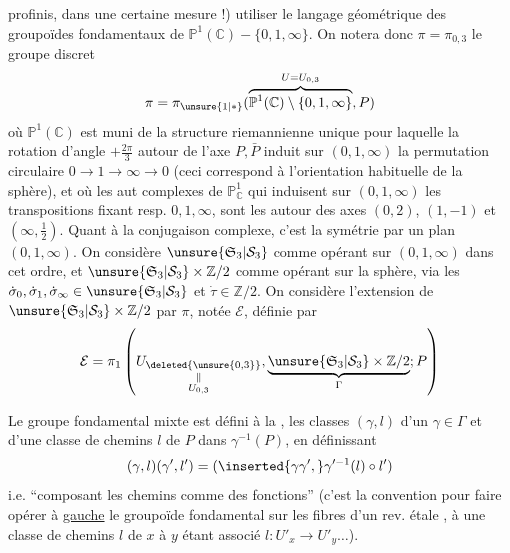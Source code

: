 profinis, dans une certaine mesure !) utiliser le langage géométrique des groupoïdes fondamentaux de $\mathbb P^1(\mathbb C)-\{0,1,\infty\}$. On  notera donc $\pi=\pi_{0,3}$ le groupe discret
\[
\pi=\pi_{\unsure{1|*}}(\overbrace{\mathbb P^1(\mathbb C)\setminus\{0,1,\infty\}}^{U=U_{0,3}},P)
\]
où $\mathbb P^1(\mathbb C)$ est muni de la structure  riemannienne  unique pour laquelle la rotation \inserted{$\dot\rho$} d'angle $+\frac{2\pi}{3}$ autour de l'axe $P,\bar P$  induit sur $(0,1,\infty)$ la permutation circulaire $0\longrightarrow1\longrightarrow\infty\longrightarrow0$ (ceci correspond à l'orientation habituelle de la sphère), et où les aut complexes  de $\mathbb P^1_{\mathbb C}$ qui   induisent  sur $(0,1,\infty)$ les transpositions fixant resp. $0,1,\infty$, sont  les   autour des axes  $(0,2)$, $(1,-1)$ et $(\infty,\frac12)$.
Quant à la conjugaison complexe, c'est la symétrie par un plan $(0,1,\infty)$. On considère $\unsure{\mathfrak S_3|\mathcal S_3}$ comme opérant sur $(0,1,\infty)$ dans cet ordre, et $\unsure{\mathfrak S_3|\mathcal S_3}\times\mathbb Z/2$ comme opérant sur la sphère, via les $\dot\sigma_0,\dot\sigma_1,\dot\sigma_\infty\in\unsure{\mathfrak S_3|\mathcal S_3}$ et $\dot\tau\in\mathbb Z/2$. On considère l'extension  de $\unsure{\mathfrak S_3|\mathcal S_3}\times\mathbb Z/2$ par $\pi$, notée  $\mathcal E$, définie par
\[
\mathcal E=\pi_1\left(\underset{\substack{\Vert\\U_{0,3}}}{U_{\deleted{\unsure{0,3}}}},\underbrace{\unsure{\mathfrak S_3|\mathcal S_3}\times\mathbb Z/2}_{\Gamma};P\right)
\]

Le groupe fondamental mixte est défini à la ,  les classes $(\gamma,l)$ d'un $\gamma\in\Gamma$ et d'une classe de chemins $l$ de $P$ dans $\gamma^{-1}(P)$, en définissant
\[
(\gamma,l)(\gamma',l')=(\inserted{\gamma\gamma',}\gamma'^{-1}(l)\circ l')
\]
i.e. ``composant les chemins comme des fonctions'' (c'est la convention pour faire opérer à \uline{gauche} le groupoïde fondamental sur les fibres d'un rev. étale , à une classe de chemins $l$ de $x$ à $y$ étant associé $l:U'_x\longrightarrow U'_y\ldots$).

